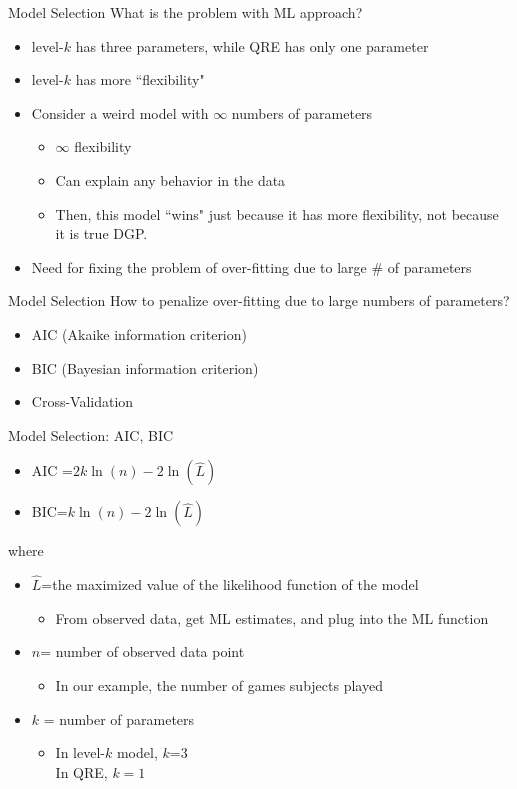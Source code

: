 \begin{frame}{Model Selection}
    What is the problem with ML approach?
   \begin{itemize}
       \item level-$k$ has three parameters, while QRE has only one parameter
       \item level-$k$ has more ``flexibility"
       \item Consider a weird model with $\infty$ numbers of parameters
       \begin{itemize}
           \item $\infty$ flexibility
           \item Can explain any behavior in the data
           \item Then, this model ``wins" just because it has more flexibility, not because it is true DGP.
       \end{itemize}
       \item Need for fixing the problem of over-fitting due to large \# of parameters
   \end{itemize}
\end{frame}

\begin{frame}{Model Selection}
    How to penalize over-fitting due to large numbers of parameters?
    \begin{itemize}
        \item AIC (Akaike information criterion)
        \item BIC (Bayesian information criterion)
        \item Cross-Validation
    \end{itemize}
\end{frame}

\begin{frame}{Model Selection: AIC, BIC}
\begin{itemize}
    \item AIC =$2k\ln(n)-2\ln({\widehat {L}})$
    \item BIC=$k\ln(n)-2\ln({\widehat {L}})$
\end{itemize}
where
\begin{itemize}
    \item $\widehat{L}$=the maximized value of the likelihood function of the model
    \begin{itemize}
        \item From observed data, get ML estimates, and plug into the ML function
    \end{itemize}
    \item $n$= number of observed data point
    \begin{itemize}
        \item In our example, the number of games subjects played
    \end{itemize}
    \item $k$ = number of parameters
    \begin{itemize}
        \item In level-$k$ model, $k$=3 \\ In QRE, $k=1$
    \end{itemize}
\end{itemize}
\end{frame}

